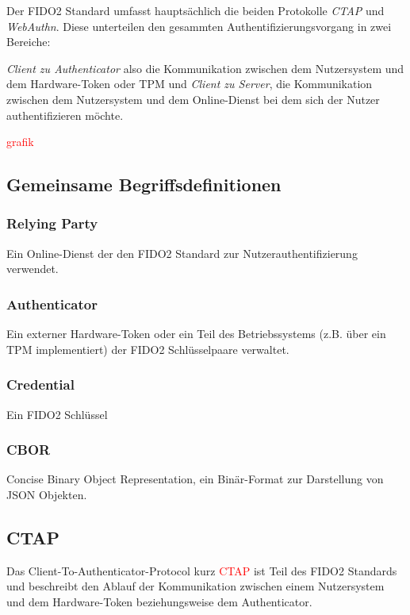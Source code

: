 \documentclass[journal]{IEEEtran}
\begin{document}
Der FIDO2 Standard umfasst hauptsächlich die beiden Protokolle \textit{CTAP}
und \textit{WebAuthn}. Diese unterteilen den gesammten
Authentifizierungsvorgang in
zwei Bereiche:

\textit{Client zu Authenticator} also die Kommunikation zwischen dem
Nutzersystem und dem Hardware-Token oder TPM und \textit{Client zu Server}, die
Kommunikation zwischen dem Nutzersystem und dem Online-Dienst bei dem sich der
Nutzer authentifizieren möchte.

\textcolor{red}{grafik}

\subsection{Gemeinsame Begriffsdefinitionen}

\subsubsection{Relying Party}

Ein Online-Dienst der den FIDO2 Standard zur Nutzerauthentifizierung verwendet.

\subsubsection{Authenticator}

Ein externer Hardware-Token oder ein Teil des Betriebssystems (z.B. über ein
TPM implementiert) der FIDO2 Schlüsselpaare verwaltet.

\subsubsection{Credential}

Ein FIDO2 Schlüssel

\subsubsection{CBOR}

Concise Binary Object Representation, ein Binär-Format zur Darstellung von JSON Objekten.

\subsection{CTAP}

Das Client-To-Authenticator-Protocol kurz \textcolor{red}{CTAP} ist Teil
des FIDO2 Standards und beschreibt den Ablauf der Kommunikation zwischen einem
Nutzersystem und dem Hardware-Token beziehungsweise dem Authenticator.
\end{document}
